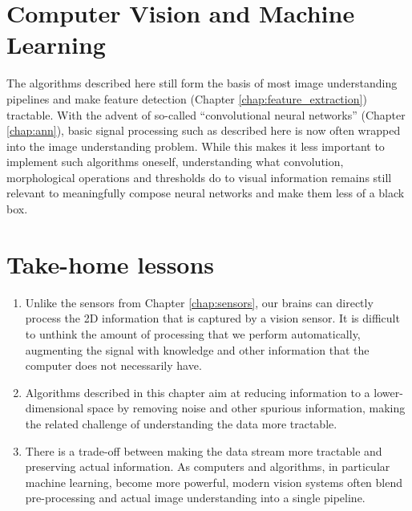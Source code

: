 \section{Computer Vision and Machine Learning}
\label{sec:cvml}
The algorithms described here still form the basis of most image understanding pipelines and make feature detection (Chapter \ref{chap:feature_extraction}) tractable. With the advent of so-called ``convolutional neural networks'' (Chapter \ref{chap:ann}), basic signal processing such as described here is now often wrapped into the image understanding problem. While this makes it less important to implement such algorithms oneself, understanding what convolution, morphological operations and thresholds do to visual information remains still relevant to meaningfully compose neural networks and make them less of a black box. 


\section*{Take-home lessons}
\begin{enumerate}
\item Unlike the sensors from Chapter \ref{chap:sensors}, our brains can directly process the 2D information that is captured by a vision sensor. It is difficult to unthink the amount of processing that we perform automatically, augmenting the signal with knowledge and other information that the computer does not necessarily have.
\item  Algorithms described in this chapter aim at reducing information to a lower-dimensional space by removing noise and other spurious information, making the related challenge of understanding the data more tractable. 
\item There is a trade-off between making the data stream more tractable and preserving actual information. As computers and algorithms, in particular machine learning, become more powerful, modern vision systems often blend pre-processing and actual image understanding into a single pipeline. 
\end{enumerate}


